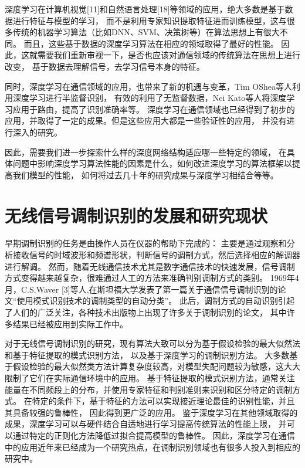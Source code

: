 深度学习在计算机视觉[11]和自然语言处理[18]等领域的应用，绝大多数是基于数据进行特征与模型的学习，
而不是利用专家知识提取特征进而训练模型，这与很多传统的机器学习算法（比如DNN、SVM、决策树等）在算法思想上有很大不同。
而且，这些基于数据的深度学习算法在相应的领域取得了最好的性能。
因此，这就需要我们重新审视一下，是否也应该对通信领域的传统算法在思想上进行改变，
基于数据去理解信号，去学习信号本身的特征。\par

同时，深度学习在通信领域的应用，也带来了新的机遇与变革，Tim OShea等人利用深度学习进行半监督识别，
有效的利用了无监督数据，Nei Kato等人将深度学习应用于路由，提高了识别准确率等。
深度学习在通信领域也已经得到了初步的应用，并取得了一定的成果。但是这些应用大都是一些验证性的应用，
并没有进行深入的研究。\par

因此，需要我们进一步探索什么样的深度网络结构适应哪一些特定的领域，
在具体问题中影响深度学习算法性能的因素是什么，如何改进深度学习的算法框架以提高我们模型的性能，
如何将过去几十年的研究成果与深度学习相结合等等。\par

\section{无线信号调制识别的发展和研究现状}

早期调制识别的任务是由操作人员在仪器的帮助下完成的：
主要是通过观察和分析接收信号的时域波形和频谱形状，判断信号的调制方式，然后选择相应的解调器进行解调。
然而，随着无线通信技术尤其是数字通信技术的快速发展，信号调制方式变得越来越复杂，很难通过人工的方法来准确判别调制方式的类别。 
1969年4月，C.S.Waver [3]等人,在斯坦福大学发表了第一篇关于通信信号调制识别的论文“使用模式识别技术的调制类型的自动分类”。
此后，调制方式的自动识别引起了人们的广泛关注，各种技术出版物上出现了许多关于调制识别的论文，
其中许多结果已经被应用到实际工作中。 \par

对于无线信号调制识别的研究，现有算法大致可以分为基于假设检验的最大似然法和基于特征提取的模式识别方法，
以及基于深度学习的调制识别方法。
大多数基于假设检验的最大似然类方法计算复杂度较高，对模型失配问题较为敏感，这大大限制了它们在实际通信环境中的应用。
基于特征提取的模式识别方法，通常关注能量在不同频段上的分布，并使用专家特征和判别准则来识别和区分特定的调制方式。
在特定的条件下，基于特征的方法可以实现接近理论最佳的识别性能，并且其具备较强的鲁棒性，
因此得到更广泛的应用。
鉴于深度学习在其他领域取得的成果，深度学习可以与硬件结合自适地进行学习提高传统算法的性能上限，
并可以通过特定的正则化方法降低过拟合提高模型的鲁棒性。
因此，深度学习在通信中的应用近年来已经成为一个研究热点，在调制识别领域也有很多人投入到相应的研究中。\par

